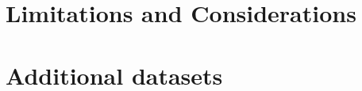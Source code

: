 \documentclass[8pt]{report}
\begin{document}
\section{Limitations and Considerations}
\section{Additional datasets}


\begin{comment}
\chapter{Methodology}
\section{Research Design and Approach}
\section{Data Collection and Preprocessing}
\subsection{Dataset Selection and Description}
\subsection{Tokenisation and Cleaning}
\subsection{Label Normalisation}
\section{Model Architecture and Implementation}
\subsection{Baseline Models}
\subsection{Transformer Fine-Tuning}
\subsection{Training Configuration}
\section{Evaluation Strategy}

\end{comment}
\end{document}
